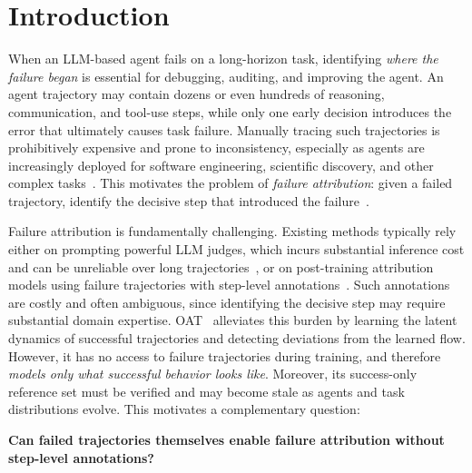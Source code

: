 \section{Introduction}
\label{sec:intro}



When an LLM-based agent fails on a long-horizon task, identifying \emph{where the failure began} is essential for debugging, auditing, and improving the agent.
An agent trajectory may contain dozens or even hundreds of reasoning, communication, and tool-use steps, while only one early decision introduces the error that ultimately causes task failure.
Manually tracing such trajectories is prohibitively expensive and prone to inconsistency, especially as agents are increasingly deployed for software engineering, scientific discovery, and other complex tasks~\citep{yao2023react,wang2024surveyagents}.
This motivates the problem of \emph{failure attribution}: given a failed trajectory, identify the decisive step that introduced the failure~\citep{whoandwhen}.



Failure attribution is fundamentally challenging.
Existing methods typically rely either on prompting powerful LLM judges, which incurs substantial inference cost and can be unreliable over long trajectories~\citep{whoandwhen,echo,chief,falat,correct}, or on post-training attribution models using failure trajectories with step-level annotations~\citep{agentracer,graphtracer}.
Such annotations are costly and often ambiguous, since identifying the decisive step may require substantial domain expertise.
OAT~\citep{oat} alleviates this burden by learning the latent dynamics of successful trajectories and detecting deviations from the learned flow.
However, it has no access to failure trajectories during training, and therefore \textit{models only what successful behavior looks like}.
Moreover, its success-only reference set must be verified and may become stale as agents and task distributions evolve.
This motivates a complementary question:

\vspace{-0.5em}
\begin{center}
\textbf{Can failed trajectories themselves enable failure attribution
without step-level annotations?}
\vspace{-0.5em}
\end{center}


